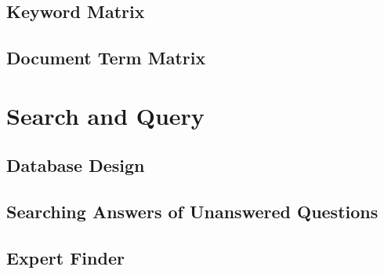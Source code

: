 \subsection{Keyword Matrix}
\subsection{Document Term Matrix}

\section{Search and Query}
\subsection{Database Design}
\subsection{Searching Answers of Unanswered Questions}
\subsection{Expert Finder}